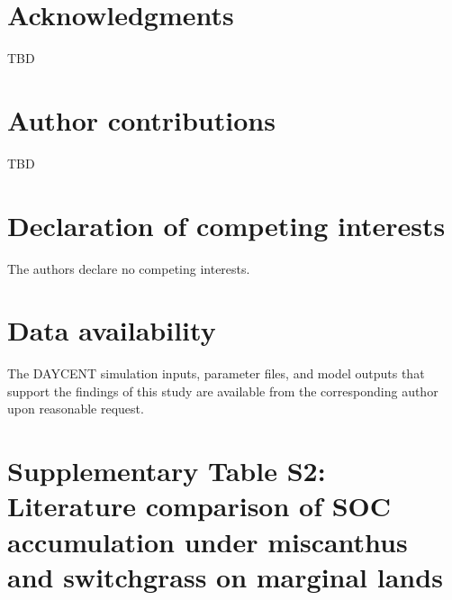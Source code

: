 \documentclass[11pt]{article}
\begin{document}
\section*{Acknowledgments}
TBD

\section*{Author contributions}
TBD

\section*{Declaration of competing interests}
The authors declare no competing interests.

\section*{Data availability}
The DAYCENT simulation inputs, parameter files, and model outputs that support the findings of this study are available from the corresponding author upon reasonable request.

\printbibliography

\clearpage
\section*{Supplementary Table S2: Literature comparison of SOC accumulation under miscanthus and switchgrass on marginal lands}
\end{document}

